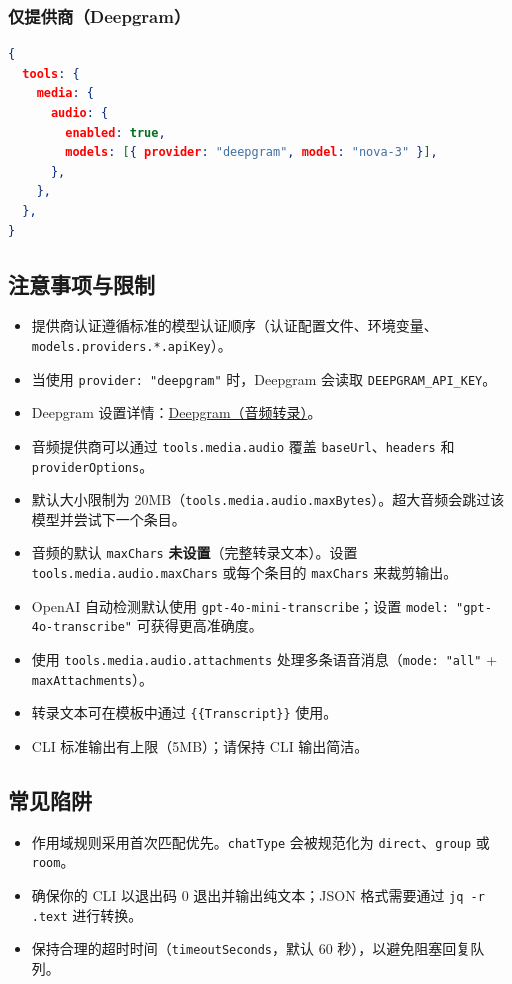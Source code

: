 \subsubsection{仅提供商（Deepgram）}


\begin{lstlisting}[language=json]
{
  tools: {
    media: {
      audio: {
        enabled: true,
        models: [{ provider: "deepgram", model: "nova-3" }],
      },
    },
  },
}
\end{lstlisting}


\subsection{注意事项与限制}


\begin{itemize}
  \item 提供商认证遵循标准的模型认证顺序（认证配置文件、环境变量、\texttt{models.providers.*.apiKey}）。
  \item 当使用 \texttt{provider: "deepgram"} 时，Deepgram 会读取 \texttt{DEEPGRAM\_API\_KEY}。
  \item Deepgram 设置详情：\href{/providers/deepgram}{Deepgram（音频转录）}。
  \item 音频提供商可以通过 \texttt{tools.media.audio} 覆盖 \texttt{baseUrl}、\texttt{headers} 和 \texttt{providerOptions}。
  \item 默认大小限制为 20MB（\texttt{tools.media.audio.maxBytes}）。超大音频会跳过该模型并尝试下一个条目。
  \item 音频的默认 \texttt{maxChars} \textbf{未设置}（完整转录文本）。设置 \texttt{tools.media.audio.maxChars} 或每个条目的 \texttt{maxChars} 来裁剪输出。
  \item OpenAI 自动检测默认使用 \texttt{gpt-4o-mini-transcribe}；设置 \texttt{model: "gpt-4o-transcribe"} 可获得更高准确度。
  \item 使用 \texttt{tools.media.audio.attachments} 处理多条语音消息（\texttt{mode: "all"} + \texttt{maxAttachments}）。
  \item 转录文本可在模板中通过 \texttt{\{\{Transcript\}\}} 使用。
  \item CLI 标准输出有上限（5MB）；请保持 CLI 输出简洁。
\end{itemize}


\subsection{常见陷阱}


\begin{itemize}
  \item 作用域规则采用首次匹配优先。\texttt{chatType} 会被规范化为 \texttt{direct}、\texttt{group} 或 \texttt{room}。
  \item 确保你的 CLI 以退出码 0 退出并输出纯文本；JSON 格式需要通过 \texttt{jq -r .text} 进行转换。
  \item 保持合理的超时时间（\texttt{timeoutSeconds}，默认 60 秒），以避免阻塞回复队列。
\end{itemize}



